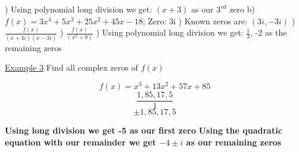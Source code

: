 \documentclass{report}
\begin{document}
   ) Using polynomial long division we get: $(x+3)$ as our $3^{rd}$ zero
   \bigbreak \bigbreak
   \noindent b) $f(x)=3x^4+5x^3+25x^2+45x-18$; Zero: 3i
  ) \large Known zeros are: $(3i, -3i)$ 
  ) \large$\frac{f(x)}{(x+3i)(x-3i)}$
  ) \large$\frac{f(x)}{(x^2+9)}$
  ) Using polynomial long division  we get: $\frac{1}{3}$, -2 as the remaining zeros 
  \bigbreak \bigbreak
  \begin{large}
    \noindent \underline{Example 3}
    Find all complex zeros of $f(x)$ 

  \end{large}
  \bigbreak \noindent \bigbreak \noindent

  $$f(x)=x^3+13x^2+57x+85$$
  \bigbreak
  $$\frac{1,85,17,5}{1}$$
  \bigbreak
  $$\pm{1,85,17,5}$$
  \bigbreak
  \begin{center}
  \textbf{Using long division we get -5 as our first zero}
  \bigbreak
  \textbf{Using the quadratic equation with our remainder we get $-4\pm{i}$ as our remaining zeros}
  \end{center}
  
\end{document}
